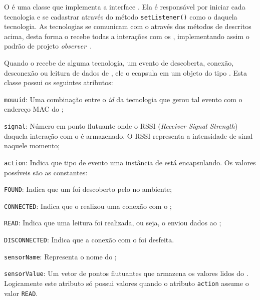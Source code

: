 O \stwopa é uma classe que implementa a interface \techlistener.
Ela é responsável por iniciar cada tecnologia e se cadastrar através do método \texttt{setListener()} como o \listener daquela tecnologia.
As tecnologias se comunicam com o \stwopa através dos métodos de \techlistener descritos acima, desta forma o \stwopa recebe todas a interações com os \smartobjs, implementando assim o padrão de projeto \textit{observer}~\cite{gamma:et-al:1994}.

Quando o \stwopa recebe de alguma tecnologia, um evento de descoberta, conexão, desconexão ou leitura de dados de \smartobjs, ele o ecapsula em um objeto do tipo \sensordata.
Esta classe possui os seguintes atributos:

\begin{alineas}
	\item \texttt{mouuid}: Uma combinação entre o \textit{id} da tecnologia que gerou tal evento com o endereço MAC do \smartobj;

	\item \texttt{signal}: Número em ponto flutuante onde o RSSI (\textit{Receiver Signal Strength}) daquela interação com o \smartobj é armazenado. O RSSI representa a intensidade de sinal naquele momento;

	\item \texttt{action}: Indica que tipo de evento uma instância de \sensordata está encapsulando. Os valores possíveis são as constantes:

	\begin{alineas}

		\item \texttt{FOUND}: Indica que um \smartobj foi descoberto pelo \mhub no ambiente;

		\item \texttt{CONNECTED}: Indica que o \mhub realizou uma conexão com o \smartobj;

		\item \texttt{READ}: Indica que uma leitura foi realizada, ou seja, o \smartobj enviou dados ao \mhub;

		\item \texttt{DISCONNECTED}: Indica que a conexão com o \smartobj foi desfeita.

	\end{alineas}

	\item \texttt{sensorName}: Representa o nome do \smartobj;

	\item \texttt{sensorValue}: Um vetor de pontos flutuantes que armazena os valores lidos do \smartobj. Logicamente este atributo só possui valores quando o atributo \texttt{action} assume o valor \texttt{READ}.
\end{alineas}

